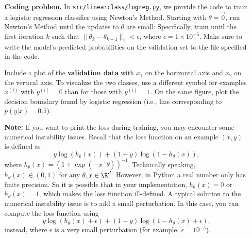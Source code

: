\item {} \textbf{Coding problem.}
In \texttt{src/linearclass/logreg.py}, we provide the code to train a
logistic regression classifier using Newton's Method.
Starting with $\theta = \vec{0}$, run Newton's Method until the updates to
$\theta$ are small: Specifically, train until the first iteration $k$ such
that $\|\theta_{k} - \theta_{k-1}\|_1 < \epsilon$, where
$\epsilon = 1\times 10^{-5}$. Make sure to write the model's predicted probabilities on
the validation set to the file specified in the code.

Include a plot of the \textbf{validation data} with $x_1$ on the horizontal axis and $x_2$ on the vertical axis.
To visualize the two classes, use a different symbol for examples $x^{(i)}$
with $y^{(i)} = 0$ than for those with $y^{(i)} = 1$. On the same figure, plot the decision boundary
found by logistic regression (i.e., line corresponding to $p(y|x) = 0.5$).

\textbf{Note:} If you want to print the loss during training, you may encounter some numerical instability issues. Recall that the loss function on an example $(x,y)$ is defined as
$$y\log(h_{\theta}(x)) +  (1 - y)\log(1 - h_{\theta}(x)),$$
where $h_\theta(x)=(1+\exp(-x^\top \theta))^{-1}.$ Technically speaking, $h_{\theta}(x)\in(0,1)$ for any $\theta,x\in\R^{d}.$ However, in Python a real number only has finite precision. So it is possible that in your implementation, $h_{\theta}(x)=0$ or $h_{\theta}(x)=1$, which makes the loss function ill-defined. A typical solution to the numerical instability issue is to add a small perturbation. In this case, you can compute the loss function using 
$$y\log(h_{\theta}(x) + \epsilon) +  (1 - y)\log(1 - h_{\theta}(x) + \epsilon),$$
instead, where $\epsilon$ is a very small perturbation (for example, $\epsilon=10^{-5}$).
